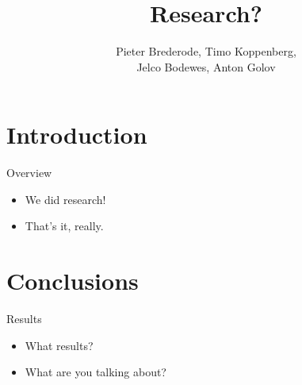 \documentclass[10pt]{beamer}
\title{Research?}
\author{Pieter Brederode, Timo Koppenberg, \\ Jelco Bodewes, Anton Golov}
\institute{B3OMI}
\begin{document}
\begin{frame}
    \maketitle
\end{frame}


\section{Introduction}
\begin{frame}{Overview}
    \begin{itemize}
        \item We did research!
        \item That's it, really.
    \end{itemize}
\end{frame}


\section{Conclusions}

\begin{frame}{Results}
    \begin{itemize}
        \item What results?
        \item What are you talking about?
    \end{itemize}
\end{frame}
\end{document}
